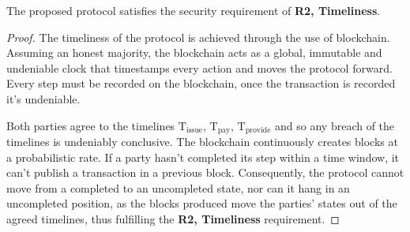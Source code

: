 \documentclass[pdftex,twocolumn,epjc3]{svjour3}
\begin{document}
\begin{theorem}
The proposed protocol satisfies the security requirement of \textbf{R2, Timeliness}.  
\end{theorem}

\begin{proof} 

The timeliness of the protocol is achieved through the use of blockchain. Assuming an honest majority, the blockchain acts as a global, immutable and undeniable clock that timestamps every action and moves the protocol forward. Every step must be recorded on the blockchain, once the transaction is recorded it's undeniable.

Both parties agree to the timelines $\mathrm{T}_\mathrm{issue}$, $\mathrm{T}_\mathrm{pay}$, $\mathrm{T}_\mathrm{provide}$ and so any breach of the timelines is undeniably conclusive. The blockchain continuously creates blocks at a probabilistic rate. If a party hasn't completed its step within a time window, it can't publish a transaction in a previous block. Consequently, the protocol cannot move from a completed to an uncompleted state, nor can it hang in an uncompleted position, as the blocks produced move the parties' states out of the agreed timelines, thus fulfilling the \textbf{R2, Timeliness} requirement.
\end{proof}


\end{document}
